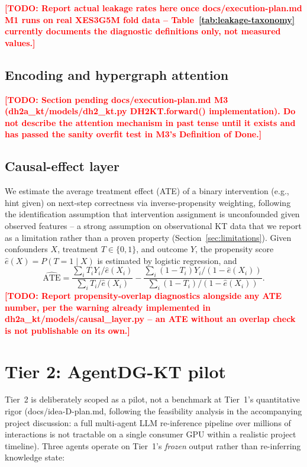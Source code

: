 \documentclass[journal]{IEEEtran}
\newcommand{\todo}[1]{\textcolor{red}{\textbf{[TODO: #1]}}}
\begin{document}
\todo{Report actual leakage rates here once docs/execution-plan.md M1 runs
on real XES3G5M fold data -- Table~\ref{tab:leakage-taxonomy} currently
documents the diagnostic definitions only, not measured values.}

\subsection{Encoding and hypergraph attention}
\todo{Section pending docs/execution-plan.md M3 (dh2a\_kt/models/dh2\_kt.py
DH2KT.forward() implementation). Do not describe the attention mechanism in
past tense until it exists and has passed the sanity overfit test in M3's
Definition of Done.}

\subsection{Causal-effect layer}
\label{sec:causal}
We estimate the average treatment effect (ATE) of a binary intervention
(e.g., hint given) on next-step correctness via inverse-propensity
weighting, following the identification assumption that intervention
assignment is unconfounded given observed features -- a strong assumption on
observational KT data that we report as a limitation rather than a proven
property (Section~\ref{sec:limitations}). Given confounders $X$, treatment
$T \in \{0,1\}$, and outcome $Y$, the propensity score $\hat{e}(X) =
P(T=1\mid X)$ is estimated by logistic regression, and
\begin{equation}
\widehat{\mathrm{ATE}} = \frac{\sum_i T_i Y_i / \hat{e}(X_i)}{\sum_i T_i /
\hat{e}(X_i)} - \frac{\sum_i (1-T_i) Y_i / (1-\hat{e}(X_i))}{\sum_i (1-T_i) /
(1-\hat{e}(X_i))}.
\label{eq:ate}
\end{equation}
\todo{Report propensity-overlap diagnostics alongside any ATE number, per
the warning already implemented in dh2a\_kt/models/causal\_layer.py -- an
ATE without an overlap check is not publishable on its own.}

\section{Tier 2: AgentDG-KT pilot}
\label{sec:tier2}

Tier~2 is deliberately scoped as a pilot, not a benchmark at Tier~1's
quantitative rigor (docs/idea-D-plan.md, following the feasibility analysis
in the accompanying project discussion: a full multi-agent LLM re-inference
pipeline over millions of interactions is not tractable on a single
consumer GPU within a realistic project timeline). Three agents operate on
Tier~1's \emph{frozen} output rather than re-inferring knowledge state:
\end{document}
